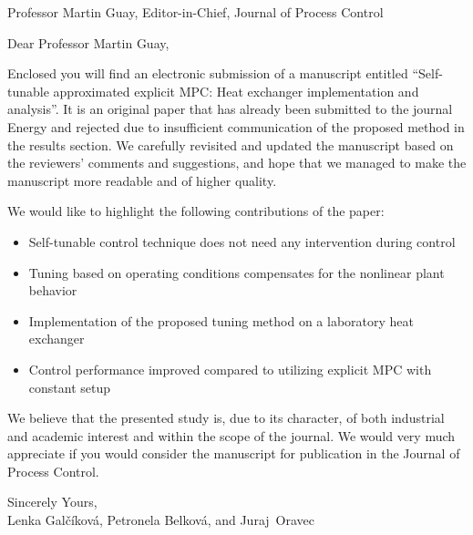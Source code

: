 \documentclass[a4paper,10pt]{letter}
\begin{document}
\pagestyle{headings}
\begin{letter}{Professor Martin Guay, Editor-in-Chief, Journal of Process Control}

\opening{Dear Professor Martin Guay,}

Enclosed you will find an electronic submission of a manuscript entitled ``Self-tunable approximated explicit MPC: Heat exchanger implementation and analysis''. It is an original paper that has already been submitted to the journal Energy and rejected due to insufficient communication of the proposed method in the results section. We carefully revisited and updated the manuscript based on the reviewers' comments and suggestions, and hope that we managed to make the manuscript more readable and of higher quality. 

We would like to highlight the following contributions of the paper:
\begin{itemize}
	\item Self-tunable control technique does not need any intervention during control
	\item Tuning based on operating conditions compensates for the nonlinear plant behavior
	\item Implementation of the proposed tuning method on a laboratory heat exchanger 
	\item Control performance improved compared to utilizing explicit MPC with constant setup
\end{itemize}

We believe that the presented study is, due to its character, of both industrial and academic interest and within the scope of the journal. We would very much appreciate if you would consider the manuscript for publication in the Journal of Process Control.

Sincerely Yours, \\
Lenka Gal\v{c}\'{i}kov\'{a}, Petronela Belkov\'{a}, and Juraj~Oravec

\end{letter}
\end{document}
